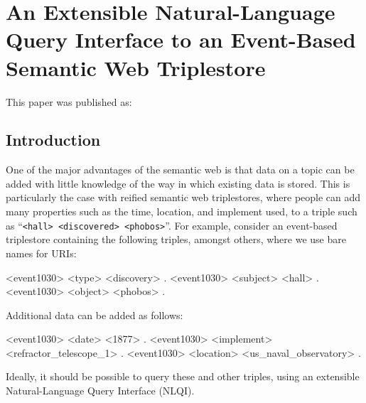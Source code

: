 \documentclass[../main.tex]{subfiles}
\begin{document}
\chapter{An Extensible Natural-Language Query Interface to an Event-Based Semantic Web Triplestore}
\begin{refsection}

\label{chapter:nliwod2018conf}

This paper was published as:



\section{Introduction}

One of the major advantages of the semantic web is that data on a topic can be added with little
knowledge of the way in which existing data is stored. This is particularly the case with reified semantic web
triplestores, where people can add many properties such as the time, location, and implement used, to
a triple such as ``\texttt{<hall> <discovered> <phobos>}''. For example, consider an event-based triplestore containing the following triples, amongst others, where we use bare names for URIs:

\begin{boldcode}
	<event1030> <type> <discovery> .
	<event1030> <subject> <hall> .
	<event1030> <object> <phobos> .
\end{boldcode}

Additional data can be added as follows:

\begin{boldcode}
	<event1030> <date> <1877> .
	<event1030> <implement> <refractor_telescope_1> .
	<event1030> <location> <us_naval_observatory> .
\end{boldcode}

Ideally, it should be possible to query these and other triples, using an extensible Natural-Language Query Interface (NLQI).


\end{refsection}
\end{document}
